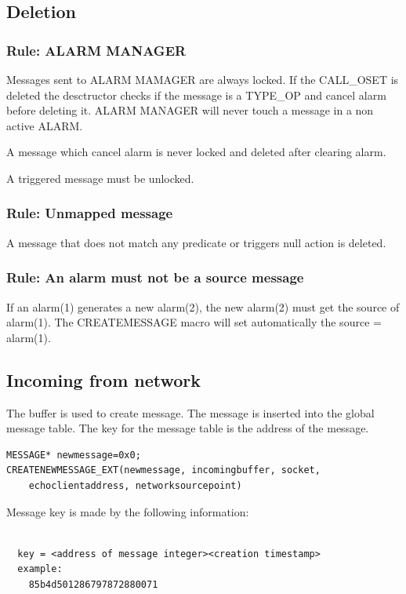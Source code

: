 \documentclass[a4paper]{report}
\begin{document}
\subsection{Deletion}

\subsubsection{Rule: ALARM MANAGER}
 Messages sent to ALARM MAMAGER are always locked. If the CALL\_OSET is deleted the desctructor checks if the message is a TYPE\_OP and cancel alarm before deleting it.
 ALARM MANAGER will never touch a message in a non active ALARM.
 
 A message which cancel alarm is never locked and deleted after clearing alarm.
 
 A triggered message must be unlocked.
 
\subsubsection{Rule: Unmapped message}
 
A message that does not match any predicate or triggers null action is deleted.
 
\subsubsection{Rule: An alarm must not be a source message}
If an alarm(1) generates a new alarm(2), the new alarm(2) must get the source of alarm(1).
The CREATEMESSAGE macro will set automatically the source = alarm(1).
 

\subsection{Incoming from network}

The buffer is used to create message. The message is inserted into the global message table. 
The key for the message table is the address of the message.

\begin{verbatim}
MESSAGE* newmessage=0x0;
CREATENEWMESSAGE_EXT(newmessage, incomingbuffer, socket,
    echoclientaddress, networksourcepoint)
\end{verbatim}

Message key is made by the following information:
\begin{verbatim}

  key = <address of message integer><creation timestamp>
  example:
    85b4d501286797872880071

\end{verbatim}
	
\end{document}
